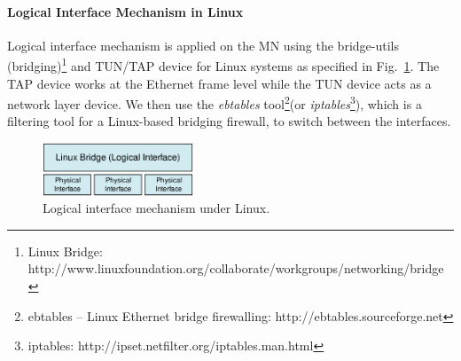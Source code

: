 \paragraph{Logical Interface Mechanism in Linux}
Logical interface mechanism is applied on the MN using the bridge-utils (bridging)\footnote{Linux Bridge: http://www.linuxfoundation.org/collaborate/workgroups/networking/bridge} and TUN/TAP device for Linux systems as specified in Fig.~\ref{fig:c8_logical_interface}. The TAP device works at the Ethernet frame level while the TUN device acts as a network layer device. We then use the \textit{ebtables} tool\footnote{ebtables – Linux Ethernet bridge firewalling: http://ebtables.sourceforge.net}(or \textit{iptables}\footnote{iptables: http://ipset.netfilter.org/iptables.man.html}), which is a filtering tool for a Linux-based bridging firewall, to switch between the interfaces. 

\begin{figure}[h!] 
  \begin{center} 
    \includegraphics[width=0.4\textwidth]{./Part2/Chapter6/figures/c8_logical_interface.eps} 
    \caption{Logical interface mechanism under Linux.}
    \label{fig:c8_logical_interface}
  \end{center} 
\end{figure}

